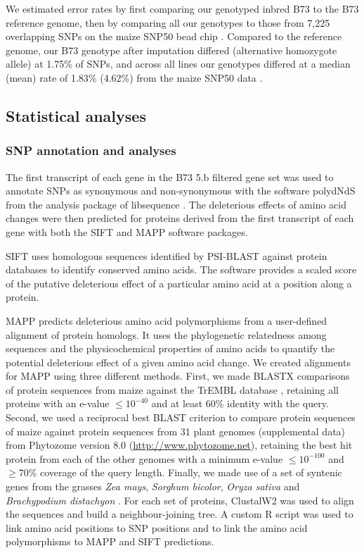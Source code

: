 \documentclass[12pt]{article}
\begin{document}
We estimated error rates by first comparing our genotyped inbred B73 to the B73 reference genome, then by comparing all our genotypes to those from 7,225 overlapping SNPs on the maize SNP50 bead chip \citep{Cook2012}.  
Compared to the reference genome, our B73 genotype after imputation differed (alternative homozygote allele) at 1.75\% of SNPs, and across all lines our genotypes differed at a median (mean) rate of 1.83\% (4.62\%) from the maize SNP50 data \citep{Cook2012}.   

\subsection*{Statistical analyses}

\subsubsection*{SNP annotation and analyses}
 The first transcript of each gene in the B73 5.b filtered gene set was used to annotate SNPs as synonymous and non-synonymous with the software polydNdS from the analysis package of libsequence  \citep{Thornton2003}. The deleterious effects of amino acid changes were then predicted for proteins derived from the first transcript of each gene with both the SIFT \citep{Ng2003, Ng2006} and MAPP \citep{Stone2005} software packages.

SIFT uses homologous sequences identified by PSI-BLAST against protein databases to identify conserved amino acids.  
The software provides a scaled score of the putative deleterious effect of a particular amino acid at a position along a protein. 

MAPP predicts deleterious amino acid polymorphisms from a user-defined alignment of protein homologs. It uses the phylogenetic relatedness among sequences and the physicochemical properties of amino acids to quantify the potential deleterious effect of a given amino acid change.  We created alignments for MAPP using three different methods.  First, we made BLASTX comparisons of protein sequences from maize against the TrEMBL database \citep{Boeckmann2003}, retaining all proteins with an e-value $\leq 10^{-40}$ and at least 60\% identity with the query.  Second, we used a reciprocal best BLAST criterion to compare protein sequences of maize against protein sequences from 31 plant genomes (supplemental data)  from Phytozome version 8.0 (\url{http://www.phytozome.net}), retaining the best hit protein from each of the other genomes with a minimum e-value $\leq 10^{-100}$ and  $\geq 70\%$ coverage of the query length. Finally, we made use of a set of syntenic genes from the grasses \emph{Zea mays}, \emph{Sorghum bicolor}, \emph{Oryza sativa} and \emph{Brachypodium distachyon}  \citep{Schnable2012}. For each set of proteins, ClustalW2 \citep{Larkin2007} was used to align the sequences and build a neighbour-joining tree. A custom R script was used to link amino acid positions to SNP positions and to link the amino acid polymorphisms to MAPP and SIFT predictions.
\end{document}
